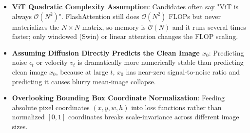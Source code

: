 \begin{trap}
\begin{itemize}
\item \textbf{ViT Quadratic Complexity Assumption}: Candidates often say "ViT is always $\mathcal{O}(N^2)$". FlashAttention still does $\mathcal{O}(N^2)$ FLOPs but never materializes the $N\times N$ matrix, so memory is $\mathcal{O}(N)$ and it runs several times faster; only windowed (Swin) or linear attention changes the FLOP scaling.
\item \textbf{Assuming Diffusion Directly Predicts the Clean Image $x_0$}: Predicting noise $\epsilon_t$ or velocity $v_t$ is dramatically more numerically stable than predicting clean image $x_0$, because at large $t$, $x_0$ has near-zero signal-to-noise ratio and predicting it causes blurry mean-image collapse.
\item \textbf{Overlooking Bounding Box Coordinate Normalization}: Feeding absolute pixel coordinates $(x, y, w, h)$ into loss functions rather than normalized $[0, 1]$ coordinates breaks scale-invariance across different image sizes.
\end{itemize}
\end{trap}
